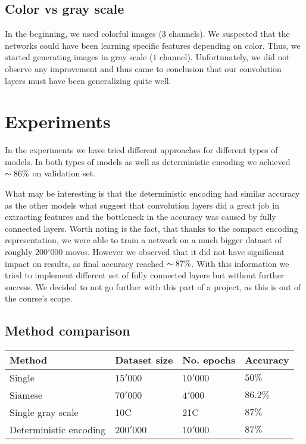 \documentclass[10pt,twocolumn,letterpaper]{article}
\begin{document}
\subsection{Color vs gray scale}

In the beginning, we used colorful images ($3$ channels). We suspected that the
networks could have been learning specific features depending on color. Thus, we
started generating images in gray scale ($1$ channel). Unfortunately, we did not
observe any improvement and thus came to conclusion that our convolution layers
must have been generalizing quite well.

\section{Experiments}

In the experiments we have tried different approaches for different types of
models. In both types of models as well as deterministic encoding we achieved
$\thicksim 86\%$ on validation set.

What may be interesting is that the deterministic encoding had similar accuracy as the other
models what suggest that convolution layers did a great job in extracting
features and the bottleneck in the accuracy was caused by fully connected
layers. Worth noting is the fact, that thanks to the compact encoding
representation, we were able to train a network on a much bigger dataset of
roughly $200'000$ moves. However we observed that it did not have significant
impact on results, as final accuracy reached $\thicksim 87\%$. With this
information we tried to implement different set of fully connected layers but
without further success. We decided to not go further with this part of a
project, as this is out of the course's scope.

\subsection{Method comparison}

\begin{center}
    \begin{tabular}{ | p{5em} | p{5em} | p{5em} | p{5em} |}
    \hline
    Method & Dataset size & No. epochs & Accuracy \\ [0.5ex] \hline \hline
    Single & $15'000$ & $10'000$ & $50\%$ \\
    \hline
    Siamese & $70'000$ & $4'000$ & $86.2\%$ \\ \hline
    Single gray scale & 10C & 21C & $87\%$ \\
    \hline
    Deterministic encoding & $200'000$ & $10'000$ & $87\%$ \\
    \hline
    \end{tabular}
\end{center}
\end{document}
